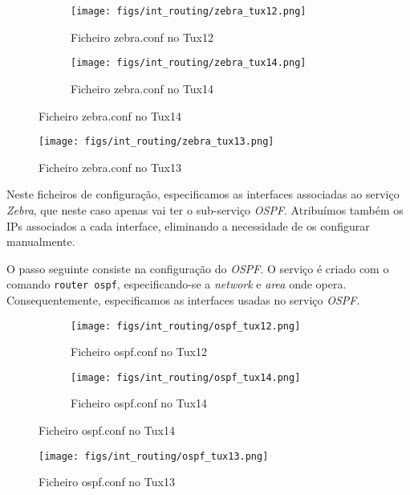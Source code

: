 \begin{figure}[H]
    \centering
    \begin{subfigure}[b]{0.49\textwidth}
        \centering
        \texttt{[image: figs/int\_routing/zebra\_tux12.png]}
        \caption{Ficheiro zebra.conf no Tux12}
        \label{fig:zebra_tux12}
    \end{subfigure}
    \begin{subfigure}[b]{0.49\textwidth}
        \centering
        \texttt{[image: figs/int\_routing/zebra\_tux14.png]}
        \caption{Ficheiro zebra.conf no Tux14}
        \label{fig:zebra_tux14}
    \end{subfigure}
\end{figure}

\begin{figure}[H]
    \centering
    \texttt{[image: figs/int\_routing/zebra\_tux13.png]}
    \caption{Ficheiro zebra.conf no Tux13}
    \label{fig:zebra_tux13}
\end{figure}

Neste ficheiros de configuração, especificamos as interfaces associadas ao serviço \textit{Zebra}, que neste caso apenas vai ter o sub-serviço \textit{OSPF}.
Atribuímos também os IPs associados a cada interface, eliminando a necessidade de os configurar manualmente.


O passo seguinte consiste na configuração do \textit{OSPF}.
O serviço é criado com o comando \verb|router ospf|, especificando-se a \textit{network} e \textit{area} onde opera.
Consequentemente, especificamos as interfaces usadas no serviço \textit{OSPF}.

\begin{figure}[H]
    \centering
    \begin{subfigure}[b]{0.49\textwidth}
        \centering
        \texttt{[image: figs/int\_routing/ospf\_tux12.png]}
        \caption{Ficheiro ospf.conf no Tux12}
        \label{fig:ospf_tux12}
    \end{subfigure}
    \begin{subfigure}[b]{0.49\textwidth}
        \centering
        \texttt{[image: figs/int\_routing/ospf\_tux14.png]}
        \caption{Ficheiro ospf.conf no Tux14}
        \label{fig:ospf_tux14}
    \end{subfigure}
\end{figure}

\begin{figure}[H]
    \centering
    \texttt{[image: figs/int\_routing/ospf\_tux13.png]}
    \caption{Ficheiro ospf.conf no Tux13}
    \label{fig:ospf_tux13}
\end{figure}

